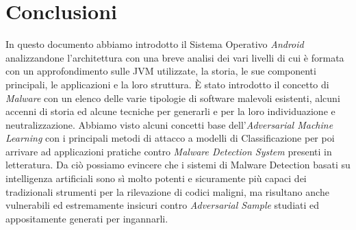 \section{Conclusioni}
In questo documento abbiamo introdotto il Sistema Operativo \textit{Android} analizzandone l'architettura con una breve analisi dei vari livelli di cui è formata con un approfondimento sulle JVM utilizzate, la storia, le sue componenti principali, le applicazioni e la loro struttura. È stato introdotto il concetto di \textit{Malware} con un elenco delle varie tipologie di software malevoli esistenti, alcuni accenni di storia ed alcune tecniche per generarli e per la loro individuazione e neutralizzazione. Abbiamo visto alcuni concetti base dell'\textit{Adversarial Machine Learning} con i principali metodi di attacco a modelli di Classificazione per poi arrivare ad applicazioni pratiche contro \textit{Malware Detection System} presenti in letteratura. Da ciò possiamo evincere che i sistemi di Malware Detection basati su intelligenza artificiali sono sì molto potenti e sicuramente più capaci dei tradizionali strumenti per la rilevazione di codici maligni, ma risultano anche vulnerabili ed estremamente insicuri contro \textit{Adversarial Sample} studiati ed appositamente generati per ingannarli.

